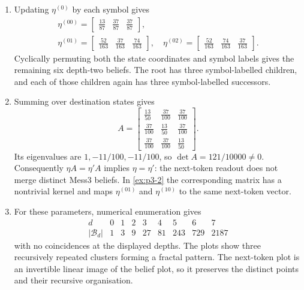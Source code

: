 \begin{solution}[ex:p3-3]
\begin{enumerate}
\begin{enumerate}
          \item Updating $\eta^{(0)}$ by each symbol gives
            \[
              \begin{gathered}
              \eta^{(00)}=
                \begin{bmatrix}\tfrac{13}{87}&\tfrac{37}{87}&\tfrac{37}{87}\end{bmatrix},\\[1mm]
              \eta^{(01)}=
                \begin{bmatrix}\tfrac{52}{163}&\tfrac{37}{163}&\tfrac{74}{163}\end{bmatrix},
              \quad
              \eta^{(02)}=
                \begin{bmatrix}\tfrac{52}{163}&\tfrac{74}{163}&\tfrac{37}{163}\end{bmatrix}.
              \end{gathered}
            \]
            Cyclically permuting both the state coordinates and symbol labels
            gives the remaining six depth-two beliefs. The root has three
            symbol-labelled children, and each of those children again has
            three symbol-labelled successors.

          \item Summing over destination states gives
            \[
              A=\begin{bmatrix}
                \tfrac{13}{50}&\tfrac{37}{100}&\tfrac{37}{100}\\
                \tfrac{37}{100}&\tfrac{13}{50}&\tfrac{37}{100}\\
                \tfrac{37}{100}&\tfrac{37}{100}&\tfrac{13}{50}
              \end{bmatrix}.
            \]
            Its eigenvalues are $1,-11/100,-11/100$, so
            $\det A=121/10000\neq0$. Consequently
            $\eta A=\eta' A$ implies $\eta=\eta'$: the next-token readout
            does not merge distinct Mess3 beliefs. In \cref{ex:p3-2} the
            corresponding matrix has a nontrivial kernel and maps
            $\eta^{(01)}$ and $\eta^{(10)}$ to the same next-token vector.

          \item For these parameters, numerical enumeration gives
            \[
              \begin{array}{c|rrrrrrrr}
                d&0&1&2&3&4&5&6&7\\ \hline
                |\mathcal B_d|&1&3&9&27&81&243&729&2187
              \end{array}
            \]
            with no coincidences at the displayed depths. The plots show
            three recursively repeated clusters forming a fractal pattern.
            The next-token plot is an invertible linear image of the belief
            plot, so it preserves the distinct points and their recursive
            organisation.


\end{enumerate}
\end{enumerate}
\end{solution}
